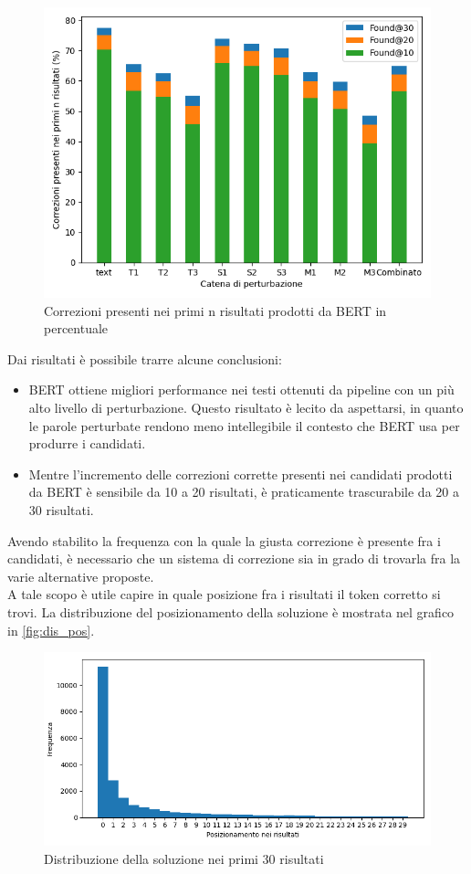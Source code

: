 \documentclass[12pt]{article}
\begin{document}
\begin{figure}[H]
\centering
\includegraphics[width=.9\textwidth]{distributions/overview.png}
\caption{Correzioni presenti nei primi n risultati prodotti da BERT in percentuale}
\label{fig:foundN}
\end{figure}

Dai risultati è possibile trarre alcune conclusioni:
\begin{itemize}
\item BERT ottiene migliori performance nei testi ottenuti da pipeline con un più alto livello di perturbazione. Questo risultato è lecito da aspettarsi, in quanto le parole perturbate rendono meno intellegibile il contesto che BERT usa per produrre i candidati.
\item Mentre l'incremento delle correzioni corrette presenti nei candidati prodotti da BERT è sensibile  da 10 a 20 risultati, è praticamente trascurabile da 20 a 30 risultati.
\end{itemize}

Avendo stabilito la frequenza con la quale la giusta correzione è presente fra i candidati, è necessario che un sistema di correzione sia in grado di trovarla fra la varie alternative proposte.\\
A tale scopo è utile capire in quale posizione fra i risultati il token corretto si trovi. La distribuzione del posizionamento della soluzione è mostrata nel grafico in \autoref{fig:dis_pos}.

\begin{figure}[H]
\centering
\includegraphics[width=\textwidth]{distributions/score_order_Combinato}
\caption{Distribuzione della soluzione nei primi 30 risultati}
\label{fig:dis_pos}
\end{figure}
\end{document}
